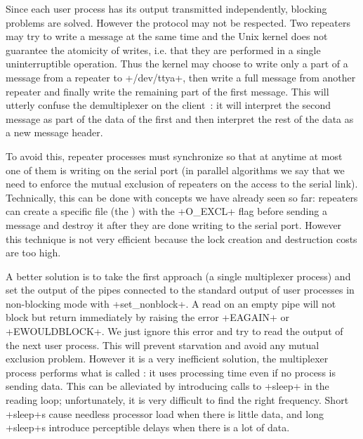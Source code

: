 Since each user process has its output transmitted independently,
blocking problems are solved. However the protocol may not be
respected. Two repeaters may try to write a message at the same time
and the Unix kernel does not guarantee the atomicity of writes,
i.e. that they are performed in a single uninterruptible operation.
Thus the kernel may choose to write only a part of a message from a
repeater to \ml+/dev/ttya+, then write a full message from another
repeater and finally write the remaining part of the first message.
This will utterly confuse the demultiplexer on the client~: 
it will interpret the second message as part of the data of the
first and then interpret the rest of the data as a new message header.

To avoid this, repeater processes must synchronize so that at anytime
at most one of them is writing on the serial port (in parallel
algorithms we say that we need to enforce the mutual exclusion of
repeaters on the access to the serial link). Technically, this can be
done with concepts we have already seen so far: repeaters can create a
specific file (the ) with the \ml+O_EXCL+ flag before
sending a message and destroy it after they are done writing to the
serial port. However this technique is not very efficient because the
lock creation and destruction costs are too high.

A better solution is to take the first approach (a single
multiplexer process) and set the output of the pipes connected to the
standard output of user processes in non-blocking mode with
\ml+set_nonblock+. A read on an empty pipe will not block but return
immediately by raising the error \ml+EAGAIN+ or \ml+EWOULDBLOCK+. We
just ignore this error and try to read the output of the next user
process. This will prevent starvation and avoid any mutual exclusion
problem. However it is a very inefficient solution, the multiplexer
process performs what is called : it uses
processing time even if no process is
sending data. This can be alleviated by introducing calls to
\ml+sleep+ in the reading loop; unfortunately, it is very difficult to find
the right frequency. Short \ml+sleep+s cause needless processor load when there
is little data, and long \ml+sleep+s introduce perceptible delays when there is a lot of data.

